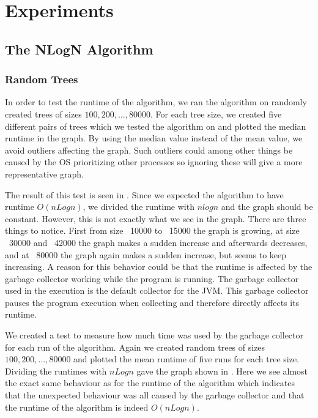 \chapter{Experiments}
\section{The NLogN Algorithm}
\subsection{Random Trees}
In order to test the runtime of the algorithm, we ran the algorithm on randomly created trees of sizes $100, 200, ..., 80000$. For each tree size, we created five different pairs of trees which we tested the algorithm on and plotted the median runtime in the graph. By using the median value instead of the mean value, we avoid outliers affecting the graph. Such outliers could among other things be caused by the OS prioritizing other processes so ignoring these will give a more representative graph.

The result of this test is seen in . Since we expected the algorithm to have runtime $O(nLogn)$, we divided the runtime with $nlogn$ and the graph should be constant. However, this is not exactly what we see in the graph. There are three things to notice. First from size ~10000 to ~15000 the graph is growing, at size ~30000 and ~42000 the graph makes a sudden increase and afterwards decreases, and at ~80000 the graph again makes a sudden increase, but seems to keep increasing. A reason for this behavior could be that the runtime is affected by the garbage collector working while the program is running. The garbage collector used in the execution is the default collector for the JVM. This garbage collector pauses the program execution when collecting and therefore directly affects its runtime.

We created a test to measure how much time was used by the garbage collector for each run of the algorithm. Again we created random trees of sizes $100, 200, ..., 80000$ and plotted the mean runtime of five runs for each tree size. Dividing the runtimes with $nLogn$ gave the graph shown in . Here we see almost the exact same behaviour as for the runtime of the algorithm which indicates that the unexpected behaviour was all caused by the garbage collector and that the runtime of the algorithm is indeed $O(nLogn)$. 



